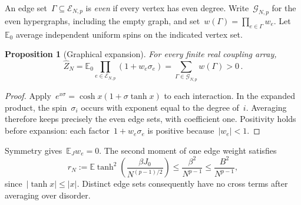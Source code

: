 \documentclass[10pt]{article}
\theoremstyle{plain}
\newtheorem{proposition}[theorem]{Proposition}
\theoremstyle{definition}
\theoremstyle{remark}
\begin{document}
An edge set~$\Gamma\subseteq\mathcal E_{N,p}$ is \emph{even} if every vertex has even degree. Write~$\mathcal G_{N,p}$ for the even hypergraphs, including the empty graph, and set~$w(\Gamma)=\prod_{e\in\Gamma}w_e$. Let~$\mathbb E_0$ average independent uniform spins on the indicated vertex set.
\begin{proposition}[Graphical expansion]\label{prop:graphical}
For every finite real coupling array,
\begin{equation}\label{eq:graphical}
 \hat Z_N=\mathbb E_0\prod_{e\in\mathcal E_{N,p}}(1+w_e\sigma_e)
 =\sum_{\Gamma\in\mathcal G_{N,p}}w(\Gamma)>0\,.
\end{equation}
\end{proposition}
\begin{proof}
Apply~$e^{x\sigma}=\cosh x(1+\sigma\tanh x)$ to each interaction. In the expanded product, the spin~$\sigma_i$ occurs with exponent equal to the degree of~$i$. Averaging therefore keeps precisely the even edge sets, with coefficient one. Positivity holds before expansion: each factor~$1+w_e\sigma_e$ is positive because~$|w_e|<1$.
\end{proof}

Symmetry gives~$\mathbb E_Jw_e=0$. The second moment of one edge weight satisfies
\begin{equation}\label{eq:rN}
 r_N:=\mathbb E\tanh^2\!\left(\frac{\beta J_0}{N^{(p-1)/2}}\right)
 \le\frac{\beta^2}{N^{p-1}}\le\frac{B^2}{N^{p-1}},
\end{equation}
since~$|\tanh x|\le|x|$. Distinct edge sets consequently have no cross terms after averaging over disorder.
\end{document}
